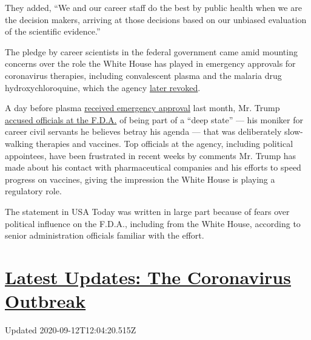 They added, ``We and our career staff do the best by public health when
we are the decision makers, arriving at those decisions based on our
unbiased evaluation of the scientific evidence.''

The pledge by career scientists in the federal government came amid
mounting concerns over the role the White House has played in emergency
approvals for coronavirus therapies, including convalescent plasma and
the malaria drug hydroxychloroquine, which the agency
\href{https://www.nytimes3xbfgragh.onion/2020/06/15/health/fda-hydroxychloroquine-malaria.html}{later
revoked}.

A day before plasma
\href{https://www.nytimes3xbfgragh.onion/2020/08/23/us/politics/fda-plasma-coronavirus.html}{received
emergency approval} last month, Mr. Trump
\href{https://www.cnn.com/2020/08/22/politics/trump-fda-coronavirus-vaccine/index.html}{accused
officials at the F.D.A.} of being part of a ``deep state'' --- his
moniker for career civil servants he believes betray his agenda --- that
was deliberately slow-walking therapies and vaccines. Top officials at
the agency, including political appointees, have been frustrated in
recent weeks by comments Mr. Trump has made about his contact with
pharmaceutical companies and his efforts to speed progress on vaccines,
giving the impression the White House is playing a regulatory role.

The statement in USA Today was written in large part because of fears
over political influence on the F.D.A., including from the White House,
according to senior administration officials familiar with the effort.

\hypertarget{latest-updates-the-coronavirus-outbreak}{%
\section{\texorpdfstring{\href{https://www.nytimes3xbfgragh.onion/2020/09/11/world/covid-19-coronavirus.html?action=click\&pgtype=Article\&state=default\&region=MAIN_CONTENT_1\&context=storylines_live_updates}{Latest
Updates: The Coronavirus
Outbreak}}{Latest Updates: The Coronavirus Outbreak}}\label{latest-updates-the-coronavirus-outbreak}}

Updated 2020-09-12T12:04:20.515Z

